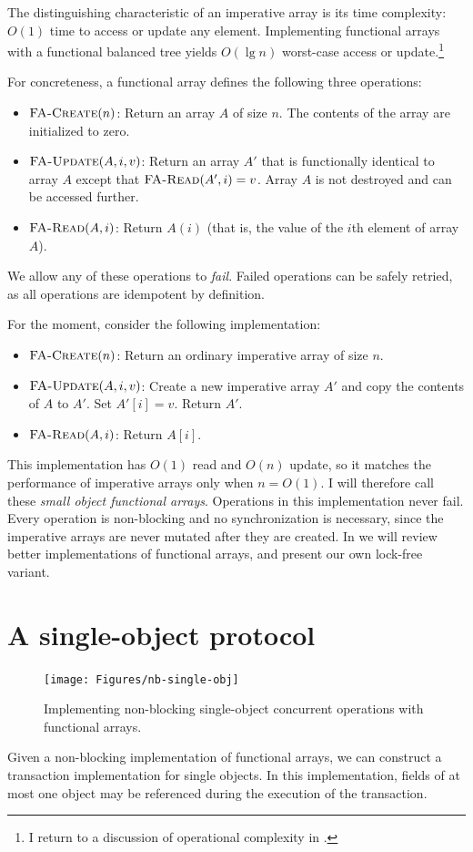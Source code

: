 The distinguishing characteristic of an imperative array is its
time complexity: $O(1)$ time to access or update any element.
Implementing functional arrays with a functional balanced tree yields
$O(\lg n)$ worst-case access or update.\footnote{I return to
a discussion of operational complexity in .}

For concreteness, a functional array defines the following three
operations:
\begin{itemize}
\item $\text{\sc FA-Create}(n)$: Return an array $A$ of size $n$.  The
  contents of the array are initialized to zero.
\item $\text{\sc FA-Update}(A, i, v)$: Return an array $A'$ that is
  functionally identical to array $A$ except that
  $\text{\sc FA-Read}(A', i)=v$.
  Array $A$ is not destroyed and can be accessed further.
\item $\text{\sc FA-Read}(A, i)$: Return $A(i)$ (that is, the
  value of the $i$th element of array $A$).
\end{itemize}
We allow any of these operations to \emph{fail}.  Failed operations
can be safely retried, as all operations are idempotent by definition.

For the moment, consider the following \naive implementation:
\begin{itemize}
\item $\text{\sc FA-Create}(n)$: Return an ordinary imperative array of size
  $n$.
\item $\text{\sc FA-Update}(A, i, v)$: Create a new imperative array
  $A'$ and copy the contents of $A$ to $A'$.  Set $A'[i]=v$. Return $A'$.
\item $\text{\sc FA-Read}(A, i)$: Return $A[i]$.
\end{itemize}
This implementation has $O(1)$ read and $O(n)$ update, so it matches
the performance of imperative arrays only when $n=O(1)$.  I will
therefore call these \emph{small object functional arrays}.  Operations
in this implementation never fail.  Every operation is non-blocking
and no synchronization is necessary, since the imperative arrays are
never mutated after they are created.   In  we will
review better implementations of functional arrays, and present our
own lock-free variant.

\section{A single-object protocol}
\begin{figure}\centering
\texttt{[image: Figures/nb-single-obj]}
\caption{Implementing non-blocking single-object concurrent operations
  with functional arrays.}
\label{fig:single-o}
\end{figure}
Given a non-blocking implementation of functional arrays, we can
construct a transaction implementation for single objects.  In
this implementation, fields of at most one object may be referenced
during the execution of the transaction.

